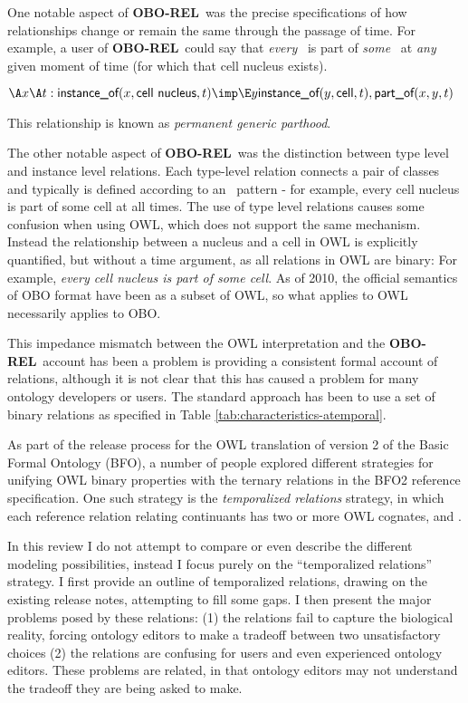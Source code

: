 \documentclass{bioinfo}
\def\partOf{\pr{part\_of}}
\def\instanceOf{\pr{instance\_of}}
\def\CellNucleus{\pr{cell nucleus}}
\def\Cell{\pr{cell}}
\def\OBOREL{\textbf{OBO-REL}}
\begin{document}
One notable aspect of \OBOREL\ was the precise specifications of how
relationships change or remain the same through the passage of
time. For example, a user of \OBOREL\ could say that \emph{every}
\CellNucleus\ is part of \emph{some} \Cell\ at \emph{any} given moment
of time (for which that cell nucleus exists).

$
\A x \A t : \instanceOf(x, \CellNucleus, t) \imp \\
 \E y \instanceOf(y, \Cell, t), \partOf(x,y,t)
$

This relationship is known as \emph{permanent generic parthood}.

The other notable aspect of \OBOREL\ was the distinction between type
level and instance level relations. Each type-level relation connects
a pair of classes and typically is defined according to an
\ pattern - for example, every cell nucleus is
part of some cell at all times. The use of type level relations causes
some confusion when using OWL, which does not support the same
mechanism. Instead the relationship between a nucleus and a cell in
OWL is explicitly quantified, but without a time argument, as all
relations in OWL are binary: For example, \emph{every cell nucleus is
  part of some cell}. As of 2010, the official semantics of OBO format
have been as a subset of OWL, so what applies to OWL necessarily
applies to OBO.

This impedance mismatch between the OWL interpretation and the
\OBOREL\ account has been a problem is providing a consistent formal
account of relations, although it is not clear that this has caused a
problem for many ontology developers or users. The standard approach
has been to use a set of binary relations as specified in Table
\ref{tab:characteristics-atemporal}.

As part of the release process for the OWL translation of version 2 of
the Basic Formal Ontology (BFO)\cite{Grenon2004}, a number of people
explored different strategies for unifying OWL binary properties with
the ternary relations in the BFO2 reference
specification\cite{Graz}. One such strategy is the \emph{temporalized
  relations} strategy, in which each reference relation relating
continuants has two or more OWL cognates,  and
.

In this review I do not attempt to compare or even describe the
different modeling possibilities, instead I focus purely on the
``temporalized relations'' strategy. I first provide an outline of
temporalized relations, drawing on the existing release notes,
attempting to fill some gaps. I then present the major problems posed
by these relations: (1) the relations fail to capture the biological
reality, forcing ontology editors to make a tradeoff between two
unsatisfactory choices (2) the relations are confusing for users and
even experienced ontology editors. These problems are related, in that
ontology editors may not understand the tradeoff they are being asked
to make.
\end{document}
